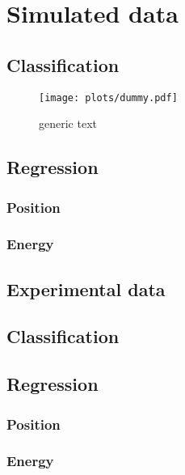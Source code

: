 \section{Simulated data}
\subsection{Classification}
\begin{figure}
\centering
\texttt{[image: plots/dummy.pdf]}
\caption[Titletext]{generic text}\label{fig:vgg_n_samples}
\end{figure}

\subsection{Regression}
\subsubsection{Position}
\subsubsection{Energy}
\subsection{Experimental data}
\subsection{Classification}
\subsection{Regression}
\subsubsection{Position}
\subsubsection{Energy}
